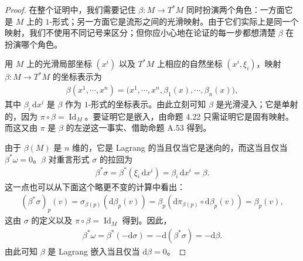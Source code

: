 \documentclass[../../main.tex]{subfiles}
\begin{document}
\begin{proof}
在整个证明中，我们需要记住 $\beta:M\to T^*M$ 同时扮演两个角色：一方面它是 $M$ 上的 $1$-形式；另一方面它是流形之间的光滑映射。由于它们实际上是同一个映射，我们不使用不同记号来区分；但你应小心地在论证的每一步都想清楚 $\beta$ 在扮演哪个角色。

用 $M$ 上的光滑局部坐标 $(x^i)$ 以及 $T^*M$ 上相应的自然坐标 $(x^i,\xi_i)$，映射 $\beta:M\to T^*M$ 的坐标表示为
\begin{align*}
\beta(x^1,\cdots ,x^n)=\big(x^1,\cdots ,x^n,\beta_1(x),\cdots ,\beta_n(x)\big),
\end{align*}
其中 $\beta_i\,\mathrm{d}x^i$ 是 $\beta$ 作为 $1$-形式的坐标表示。由此立刻可知 $\beta$ 是光滑浸入；它是单射的，因为 $\pi\circ\beta=\operatorname{Id}_M$。要证明它是嵌入，由命题 4.22 只需证明它是固有映射。而这又由 $\pi$ 是 $\beta$ 的左逆这一事实、借助命题 A.53 得到。

由于 $\beta(M)$ 是 $n$ 维的，它是 Lagrang 的当且仅当它是迷向的，而这当且仅当 $\beta^*\omega=0$。$\beta$ 对重言形式 $\sigma$ 的拉回为
\begin{align*}
\beta^*\sigma=\beta^*(\xi_i\,\mathrm{d}x^i)=\beta_i\,\mathrm{d}x^i=\beta.
\end{align*}
这一点也可以从下面这个略更不变的计算中看出：
\begin{align*}
(\beta^*\sigma)_p(v)=\sigma_{\beta(p)}(\mathrm{d}\beta_p(v))
=\beta_p(\mathrm{d}\pi_{\beta(p)}\circ\mathrm{d}\beta_p(v))=\beta_p(v),
\end{align*}
这由 $\sigma$ 的定义以及 $\pi\circ\beta=\operatorname{Id}_M$ 得到。因此，
\begin{align*}
\beta^*\omega=\beta^*(-\mathrm{d}\sigma)=-\mathrm{d}(\beta^*\sigma)=-\mathrm{d}\beta.
\end{align*}
由此可知 $\beta$ 是 Lagrang 嵌入当且仅当 $\mathrm{d}\beta=0$。
\end{proof}
\end{document}
